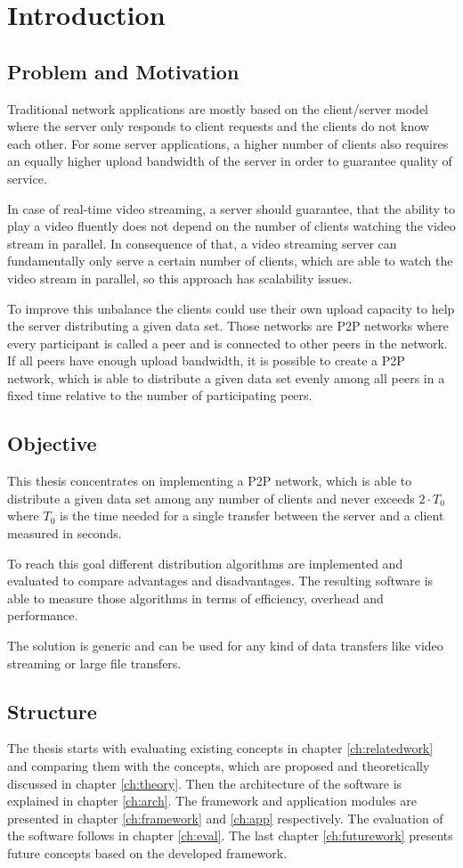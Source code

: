 \chapter{Introduction}
\section{Problem and Motivation}
Traditional network applications are mostly based on the client/server model where the server only responds to client requests and the clients do not know each other. 
For some server applications, a higher number of clients also requires an equally higher upload bandwidth of the server in order to guarantee quality of service.

In case of real-time video streaming, a server should guarantee, that the ability to play a video fluently does not depend on the number of clients watching the video stream in parallel. In consequence of that, a video streaming server can fundamentally only serve a certain number of clients, which are able to watch the video stream in parallel, so this approach has scalability issues.

To improve this unbalance the clients could use their own upload capacity to help the server distributing a given data set. Those networks are P2P networks where every participant is called a peer and is connected to other peers in the network. If all peers have enough upload bandwidth, it is possible to create a P2P network, which is able to distribute a given data set evenly among all peers in a fixed time relative to the number of participating peers.

\section{Objective}
This thesis concentrates on implementing a P2P network, which is able to distribute a given data set among any number of clients and never exceeds $2 \cdot T_0$ where $T_0$ is the time needed for a single transfer between the server and a client measured in seconds.

To reach this goal different distribution algorithms are implemented and evaluated to compare advantages and disadvantages. The resulting software is able to measure those algorithms in terms of efficiency, overhead and performance.

The solution is generic and can be used for any kind of data transfers like video streaming or large file transfers.

\section{Structure}
The thesis starts with evaluating existing concepts in chapter \ref{ch:relatedwork} and comparing them with the concepts, which are proposed and theoretically discussed in chapter \ref{ch:theory}. Then the architecture of the software is explained in chapter \ref{ch:arch}. The framework and application modules are presented in chapter \ref{ch:framework} and \ref{ch:app} respectively. The evaluation of the software follows in chapter \ref{ch:eval}. The last chapter \ref{ch:futurework} presents future concepts based on the developed framework.